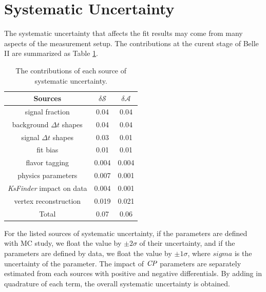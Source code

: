\section{Systematic Uncertainty}
The systematic uncertainty that affects the fit results may come from many aspects of the measurement setup. The contributions at the curent stage of Belle II are summarized as Table \ref{tab:sy_sub}.

\begin{table}
	\centering
	\begin{tabular}{c|c|c} 
		\hline
		Sources &  $\delta \mathcal{S}$ & $\delta \mathcal{A}$\\
		\hline
		signal fraction  & 0.04 & 0.04 \\
		background $\Delta t$ shapes & 0.04 & 0.04\\
		signal $\Delta t$ shapes & 0.03 & 0.01 \\
		fit bias & 0.01 & 0.01 \\
		flavor tagging  & 0.004 & 0.004 \\
		physics parameters & 0.007 & 0.001\\ 
		\textit{KsFinder} impact on data & 0.004 & 0.001\\
		vertex reconstruction & 0.019 & 0.021\\
		\hline
		Total & 0.07 & 0.06\\
		\hline
	\end{tabular}
	\caption{The contributions of each source of systematic uncertainty.}
	\label{tab:sy_sub}
\end{table}

For the listed sources of systematic uncertainty, if the parameters are defined with MC study, we float the value by $\pm 2 \sigma$ of their uncertainty, and if the parameters are defined by data, we float the value by $\pm 1 \sigma$, where $sigma$ is the uncertainty of the parameter. The impact of $\it{CP}$ parameters are separately estimated from each sources with positive and negative differentials. By adding in quadrature of each term, the overall systematic uncertainty is obtained. 



